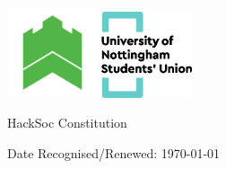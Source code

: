 \documentclass[a4paper,twoside,notitlepage,11pt]{article}
\newcommand{\paperTitle}{HackSoc Constitution}
\begin{document}
\begin{center}
\includegraphics[width=0.2\textwidth]{img/hackSocLogo.png}
\includegraphics[width=0.2\textwidth]{img/suLogo.png}
\ \\
	\begin{LARGE}
		\paperTitle \\
	\end{LARGE}
\end{center}
\begin{flushright}
Date Recognised/Renewed: \today \\
\end{flushright}
\end{document}
